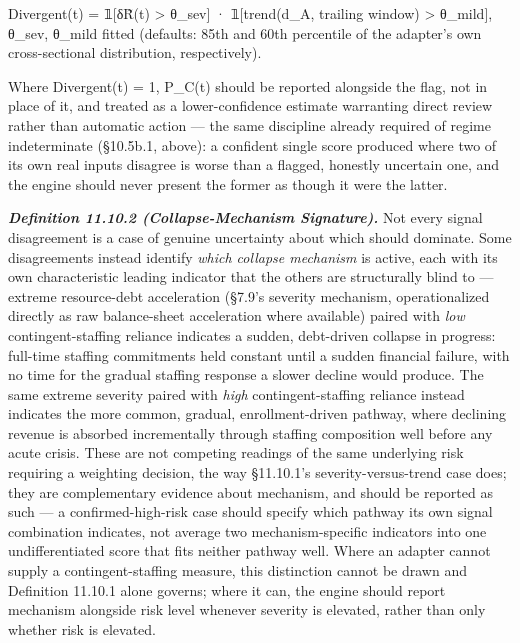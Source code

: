 \documentclass[
]{article}
\begin{document}
Divergent(t) = 𝟙{[}δR̃(t) \textgreater{} θ\_sev{]} · 𝟙{[}trend(d\_A,
trailing window) \textgreater{} θ\_mild{]}, θ\_sev, θ\_mild fitted
(defaults: 85th and 60th percentile of the adapter's own cross-sectional
distribution, respectively).

Where Divergent(t) = 1, P\_C(t) should be reported alongside the flag,
not in place of it, and treated as a lower-confidence estimate
warranting direct review rather than automatic action --- the same
discipline already required of regime indeterminate (§10.5b.1, above): a
confident single score produced where two of its own real inputs
disagree is worse than a flagged, honestly uncertain one, and the engine
should never present the former as though it were the latter.

\emph{\textbf{Definition 11.10.2 (Collapse-Mechanism Signature).}} Not
every signal disagreement is a case of genuine uncertainty about which
should dominate. Some disagreements instead identify \emph{which
collapse mechanism} is active, each with its own characteristic leading
indicator that the others are structurally blind to --- extreme
resource-debt acceleration (§7.9's severity mechanism, operationalized
directly as raw balance-sheet acceleration where available) paired with
\emph{low} contingent-staffing reliance indicates a sudden, debt-driven
collapse in progress: full-time staffing commitments held constant until
a sudden financial failure, with no time for the gradual staffing
response a slower decline would produce. The same extreme severity
paired with \emph{high} contingent-staffing reliance instead indicates
the more common, gradual, enrollment-driven pathway, where declining
revenue is absorbed incrementally through staffing composition well
before any acute crisis. These are not competing readings of the same
underlying risk requiring a weighting decision, the way §11.10.1's
severity-versus-trend case does; they are complementary evidence about
mechanism, and should be reported as such --- a confirmed-high-risk case
should specify which pathway its own signal combination indicates, not
average two mechanism-specific indicators into one undifferentiated
score that fits neither pathway well. Where an adapter cannot supply a
contingent-staffing measure, this distinction cannot be drawn and
Definition 11.10.1 alone governs; where it can, the engine should report
mechanism alongside risk level whenever severity is elevated, rather
than only whether risk is elevated.
\end{document}

